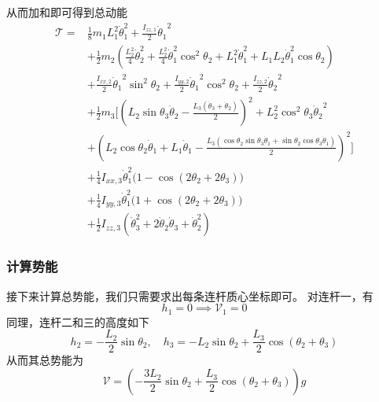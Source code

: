 \documentclass{ctexart}
\begin{document}
从而加和即可得到总动能
\[
    \begin{aligned}
        \mathcal T = & \frac{1}{8} m_1 L_1^2 \dot\theta_1^2 + \frac{I_{zz,1}}{2} {\dot \theta_1}^2 \\
        & + \frac{1}{2} m_2 (\frac{L_2^2}{4} \dot \theta_2^2 + \frac{L_2^2}{4}\dot\theta_1^2 \cos^2 \theta_2 + L_1^2 \dot\theta_1^2 + L_1 L_2 \dot\theta_1^2 \cos\theta_2) \\
        & + \frac{I_{xx,2}}{2} {\dot\theta_1}^2 \sin^2\theta_2+ \frac{I_{yy,2}}{2} {\dot\theta_1}^2 \cos^2\theta_2 + \frac{I_{zz,2}}{2} {\dot\theta_2}^2\\
        & + \frac{1}{2} m_3 \Big[ {{\left( {L_2} \sin\theta_3 \dot\theta_2-\frac{{L_3} \left( \dot\theta_3+\dot\theta_2\right) }{2}\right) }^{2}}+{L_2^{2}} {{\cos^{2}\theta_3}} {{\dot\theta_2}^{2}} \\ 
        &+ {{\left( {L_2} \cos\theta_2 \dot\theta_1 + L_1 \dot \theta_1 -\frac{{L_3} \left( \cos\theta_2 \sin\theta_3 \dot\theta_1+\sin\theta_2 \cos\theta_3 \dot\theta_1\right) }{2}\right) }^{2}} \Big] \\
        &+ \frac{1}{4} I_{xx,3} \dot\theta_1^2 \big( 1 - \cos(2\theta_2 + 2\theta_3) \big) \\
        &+ \frac{1}{4} I_{yy,3} \dot\theta_1^2 \big( 1 + \cos(2\theta_2 + 2\theta_3) \big) \\
        &+ \frac{1}{2} I_{zz,3} (\dot\theta_3^2 + 2 \dot\theta_2 \dot\theta_3 + \dot\theta_2^2)
    \end{aligned}
\]

\subsubsection{计算势能}

接下来计算总势能，我们只需要求出每条连杆质心坐标即可。
对连杆一，有
\[ h_1 = 0 \implies \mathcal V_1 = 0\]
同理，连杆二和三的高度如下
\[
    h_2 = - \frac{L_2}{2} \sin \theta_2,\quad h_3 = - L_2 \sin \theta_2 + \frac{L_3}{2} \cos(\theta_2+\theta_3)
\]
从而其总势能为
\[
    \mathcal V = (- \frac{3L_2}{2} \sin \theta_2 + \frac{L_3}{2} \cos(\theta_2+\theta_3))g
\]
\end{document}
